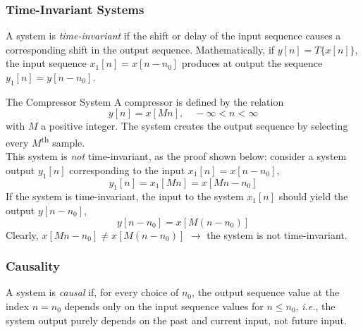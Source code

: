 \subsubsection{Time-Invariant Systems}
A system is \textit{time-invariant} if the shift or delay of the input sequence causes a corresponding shift in the output sequence. Mathematically, if $y[n] = T\{x[n]\}$, the input sequence $x_{1}[n]=x[n-n_0]$ produces at output the sequence $y_{1}[n]=y[n-n_0]$. 

\begin{ex}{The Compressor System}
A compressor is defined by the relation
\[
    y[n] = x[Mn], \quad -\infty < n < \infty
\]
with $M$ a positive integer. The system creates the output sequence by selecting every $M$\textsuperscript{th} sample. \\

This system is \textit{not} time-invariant, as the proof shown below: consider a system output $y_1[n]$ corresponding to the input $x_1[n]=x[n-n_0]$, 
\[
    y_1[n] = x_1[Mn] = x[Mn-n_0]
\]
If the system is time-invariant, the input to the system $x_1[n]$ should yield the output $y[n-n_0]$,
\[
    y[n-n_0] = x[M(n-n_0)]
\]
Clearly, $x[Mn-n_0] \neq x[M(n-n_0)]$ $\to$ the system is not time-invariant. 
\end{ex}
\subsubsection{Causality}
A system is \textit{causal} if, for every choice of $n_0$, the output sequence value at the index $n=n_0$ depends only on the input sequence values for $n\leq n_0$, \textit{i.e.}, the system output purely depends on the past and current input, not future input. 

